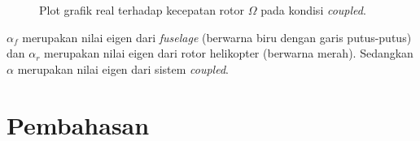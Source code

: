 \begin{figure}[H]
	\centering
	\caption{Plot grafik real terhadap kecepatan rotor $\Omega$ pada kondisi \textit{coupled}.}
	\label{fig:real(coupled)}
\end{figure}

$\alpha_f$ merupakan nilai eigen dari \textit{fuselage} (berwarna biru dengan garis putus-putus) dan $\alpha_r$ merupakan nilai eigen dari rotor helikopter (berwarna merah). Sedangkan $\alpha$ merupakan nilai eigen dari sistem \textit{coupled}.

\section{Pembahasan}
\label{sec:pembahasan}
